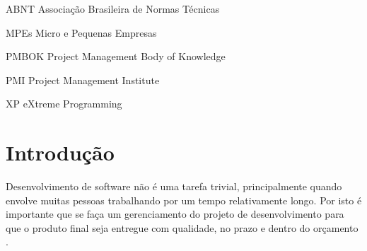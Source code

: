 \documentclass[
    12pt,               %
    openright,          %
    twoside,            %
    a4paper,            %
    chapter=TITLE,     %
    english,            %
    spanish,            %
    portuguese              %
    ]{abntex2}
\begin{document}




\label{lista ilustrações}
  \listoffigures*
  \cleardoublepage


\label{lista tabelas}
  \listoftables*
  \cleardoublepage


\label{lista siglas}
\begin{siglas}
	\item[ABNT] Associação Brasileira de Normas Técnicas
	\item[MPEs] Micro e Pequenas Empresas
	\item[PMBOK] Project Management Body of Knowledge
	\item[PMI] Project Management Institute
	\item[XP] eXtreme Programming

\end{siglas}


\tableofcontents

\textual


\chapter{Introdução}

Desenvolvimento de software não é uma tarefa trivial, principalmente quando envolve muitas pessoas trabalhando por um tempo relativamente longo. Por isto é importante que se faça um gerenciamento do projeto de desenvolvimento para que o produto final seja entregue com qualidade, no prazo e dentro do orçamento \cite[p.~555]{pressman2011}.
\end{document}
